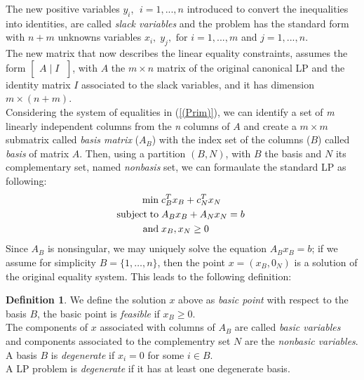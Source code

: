\documentclass[a4paper,10 pt,titlepage,twoside]{book}
\theoremstyle{plain}
\theoremstyle{definition}
\newtheorem{defn}[thm]{Definition}
\theoremstyle{remark}
\begin{document}
The new positive variables $\mathit{y_{i}}$, $\;i=1, ..., n$ introduced to convert the inequalities into identities, are called \textit{slack variables} and the problem has the standard form with $n+m$ unknowns variables $x_{i},\; y_{j}, \text{ for }i =1, ..., m$ and $j=1, ..., n$.\\ The new matrix that now describes the linear equality constraints, assumes the form $\left[\begin{matrix}A\;\vert\; I\;\end{matrix}\right]$, with $A$ the $m \times n$ matrix of the original canonical LP and the identity matrix $I$ associated to the slack variables, and it has dimension $m \times (n + m)$.\\
Considering the system of equalities in (\ref{(Prim)}), we can identify a set of \textit{m} linearly independent columns from the \textit{n} columns of  $A$ and create a $m \times m$ submatrix called \textit{basis matrix} ($A_{B}$) with the index set of the columns ($B$) called \textit{basis} of matrix $A$. Then, using a partition $(B, N)$, with $B$ the basis and $N$ its complementary set, named \textit{nonbasis} set, we can formaulate the standard LP as following:
\begin{equation}\label{(Prim1)}
\begin{split}
\min\;&c_{B}^{T}x_{B}+c_{N}^{T}x_{N}\\
\text{subject\;to\;}&A_{B}x_{B}+A_{N}x_{N}= b\;\\\text{and\;}&x_{B},x_{N}\geq0
\end{split}
\end{equation}
Since $A_{B}$ is nonsingular, we may uniquely solve the equation $A_{B}x_{B} = b$; if we assume for simplicity $B = \{1, \dots, n\}$, then the point $x =\left(x_{B},0_{N}\right)$ is a solution of the original equality system. This leads to the following definition:
\begin{defn}

	We define the solution $x$ above as \textit{basic point} with respect to the basis $B$, the basic point is \textit{feasible} if $x_{B}\geq 0$. \\The components of $x$ associated with columns of $A_{B}$ are called \textit{basic variables} and components associated to the complementry set $N$ are the \textit{nonbasic variables}.\\
	A basis $B$ is \textit{degenerate} if $x_{i}= 0$ for some $i\in B$.\\
	A LP problem is \textit{degenerate} if it has at least one degenerate basis.
\end{defn}
\end{document}
